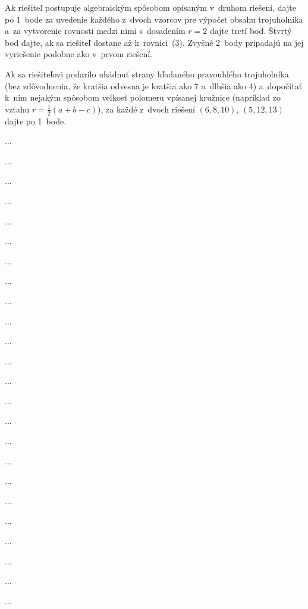 {Ak riešiteľ postupuje algebraickým spôsobom opísaným v~druhom
riešení, dajte po 1~bode za uvedenie každého z~dvoch vzorcov pre výpočet
obsahu trojuholníka a~za vytvorenie rovnosti medzi
nimi s~dosadením $r = 2$ dajte tretí bod. Štvrtý bod dajte, ak
sa riešiteľ dostane až k~rovnici~(3). Zvyšné 2~body
pripadajú na jej vyriešenie podobne ako v~prvom riešení.

Ak sa riešiteľovi podarilo uhádnuť strany hľadaného
pravouhlého trojuholníka (bez zdôvodnenia, že kratšia odvesna je kratšia ako 7 a~dlhšia ako 4) a~dopočítať k~nim nejakým spôsobom
veľkosť polomeru vpísanej kružnice (napríklad zo vzťahu
$r = \frac12(a+b-c)$), za každé z~dvoch riešení $(6, 8, 10)$, $(5, 12, 13)$
dajte po 1~bode.
\endpetit}

{%
...}

{%
...}

{%
...}

{%
...}

{%
...}

{%
...}

{%
...}

{%
...}

{%
...}

{%
...}

{%
...}

{%
...}

{%
...}

{%
...}

{%
...}

{%
...}

{%
...}

{%
...}

{%
...}

{%
...}

{%
...}

{%
...}

{%
...}

{%
...}


